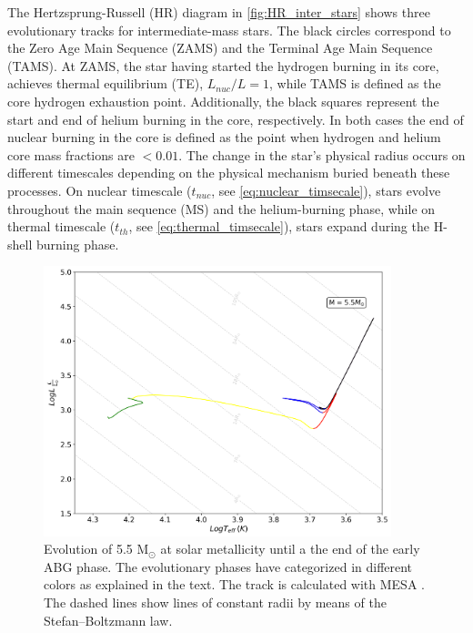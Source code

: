 The Hertzsprung-Russell (HR) diagram in \cref{fig:HR_inter_stars} shows three evolutionary tracks for intermediate-mass stars. The black circles correspond to the Zero Age Main Sequence (ZAMS) and the Terminal Age Main Sequence (TAMS). At ZAMS, the star having started the hydrogen burning in its core, achieves thermal equilibrium (TE), $L_{nuc}/L =1$, while TAMS is defined as the core hydrogen exhaustion point. Additionally, the black squares represent the start and end of helium burning in the core, respectively. In both cases the end of nuclear burning in the core is defined as the point when hydrogen and helium core mass fractions are $< 0.01$. The change in the star's physical radius occurs on different timescales depending on the physical mechanism buried beneath these processes. On nuclear timescale ($t_{nuc}$, see \ref{eq:nuclear_timsecale}), stars evolve throughout the main sequence (MS) and the helium-burning phase, while on thermal timescale ($t_{th}$, see \ref{eq:thermal_timsecale}), stars expand during the H-shell burning phase.

\begin{figure}[H]
    \centering
    \includegraphics[width=0.9\textwidth]{Thesis/graphs/HR_evolution.pdf}
    \caption{Evolution of 5.5 M$_{\odot}$ at solar metallicity until a the end of the early ABG phase. The evolutionary phases have categorized in different colors as explained in the text. The track is calculated with MESA \citep{paxton2010modules,paxton2013modules,paxton2015modules,paxton2019modules}. The dashed lines show lines of constant radii by means of the Stefan–Boltzmann law.}
    \label{fig:HR_evolution}
\end{figure}

